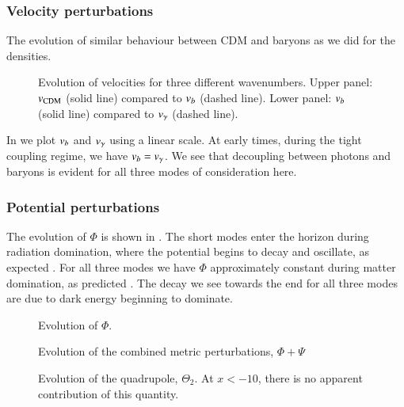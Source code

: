 \subsubsection{Velocity perturbations}\label{sssec:M3:results:velocity_perturbations}
The evolution of   similar behaviour between CDM and baryons as we did for the densities. 

\begin{figure}[ht!]
    \caption{Evolution of velocities for three different wavenumbers. Upper panel: $v_\mathrm{CDM}$ (solid line) compared to $v_b$ (dashed line). Lower panel: $v_b$ (solid line) compared to $v_\gamma$ (dashed line).}
    \label{fig:M3:results:vels}
\end{figure}

In  we plot $v_b$ and $v_\gamma$ using a linear scale. At early times, during the tight coupling regime, we have $v_b=v_\gamma$. We see that decoupling between photons and baryons is evident for all three modes of consideration here.  



\subsubsection{Potential perturbations} \label{sssec:M3:results:metric_perturbations}
The evolution of $\Phi$ is shown in . The short modes enter the horizon during radiation domination, where the potential begins to decay and oscillate, as expected . For all three modes we have $\Phi$ approximately constant during matter domination, as predicted . The decay we see towards the end for all three modes are due to dark energy beginning to dominate. 
\begin{figure}[ht!]
    \caption{Evolution of $\Phi$.}
    \label{fig:M3:results:Phi}
\end{figure}


\begin{figure}[ht!]
    \caption{Evolution of the combined metric perturbations, $\Phi+\Psi$}
    \label{fig:M3:results:Phi_plus_Psi}
\end{figure}



\begin{figure}[ht!]
    \caption{Evolution of the quadrupole, $\Theta_2$. At $x<-10$, there is no apparent contribution of this quantity.}
    \label{fig:M3:results:Theta2}
\end{figure}
